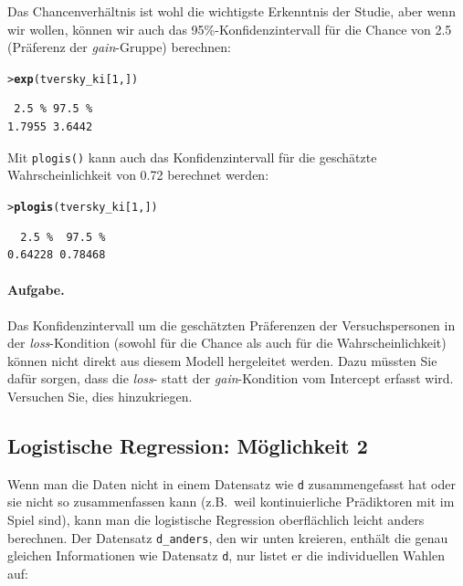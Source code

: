 \documentclass[oneside, 10pt]{book}\usepackage[]{graphicx}\usepackage[]{xcolor}
\makeatletter
\newcommand{\hlnum}[1]{\textcolor[rgb]{0.686,0.059,0.569}{#1}}%
\newcommand{\hlstd}[1]{\textcolor[rgb]{0.345,0.345,0.345}{#1}}%
\newcommand{\hlkwd}[1]{\textcolor[rgb]{0.737,0.353,0.396}{\textbf{#1}}}%
\newenvironment{kframe}{%
 \def\at@end@of@kframe{}%
 \ifinner\ifhmode%
  \def\at@end@of@kframe{\end{minipage}}%
  \begin{minipage}{\columnwidth}%
 \fi\fi%
 \def\FrameCommand##1{\hskip\@totalleftmargin \hskip-\fboxsep
 \colorbox{shadecolor}{##1}\hskip-\fboxsep
     \hskip-\linewidth \hskip-\@totalleftmargin \hskip\columnwidth}%
 \MakeFramed {\advance\hsize-\width
   \@totalleftmargin\z@ \linewidth\hsize
   \@setminipage}}%
 {\par\unskip\endMakeFramed%
 \at@end@of@kframe}
\newenvironment{knitrout}{}{} %
\makeatother
\begin{document}
Das Chancenverhältnis ist wohl die wichtigste Erkenntnis
der Studie, aber wenn wir wollen, können wir auch
das 95\%-Konfidenzintervall für die Chance
von 2.5 (Präferenz der \textit{gain}-Gruppe) berechnen:
\begin{knitrout}
\color{fgcolor}\begin{kframe}
\begin{alltt}
\hlstd{> }\hlkwd{exp}\hlstd{(tversky_ki[}\hlnum{1}\hlstd{, ])}
\end{alltt}
\begin{verbatim}
 2.5 % 97.5 % 
1.7955 3.6442 
\end{verbatim}
\end{kframe}
\end{knitrout}

Mit \texttt{plogis()} kann auch das Konfidenzintervall
für die geschätzte Wahrscheinlichkeit von 0.72 berechnet werden:
\begin{knitrout}
\color{fgcolor}\begin{kframe}
\begin{alltt}
\hlstd{> }\hlkwd{plogis}\hlstd{(tversky_ki[}\hlnum{1}\hlstd{, ])}
\end{alltt}
\begin{verbatim}
  2.5 %  97.5 % 
0.64228 0.78468 
\end{verbatim}
\end{kframe}
\end{knitrout}

\paragraph{Aufgabe.}
Das Konfidenzintervall um die geschätzten Präferenzen
der Versuchspersonen in der \textit{loss}-Kondition
(sowohl für die Chance als auch für die Wahrscheinlichkeit)
können nicht direkt aus diesem Modell hergeleitet werden.
Dazu müssten Sie dafür sorgen, dass die \textit{loss}-
statt der \textit{gain}-Kondition vom Intercept erfasst wird.
Versuchen Sie, dies hinzukriegen.

\subsection{Logistische Regression: Möglichkeit 2}
Wenn man die Daten nicht in einem Datensatz wie \texttt{d}
zusammengefasst hat oder sie nicht so zusammenfassen kann
(z.B.\ weil kontinuierliche Prädiktoren mit im Spiel sind),
kann man die logistische Regression oberflächlich leicht
anders berechnen. Der Datensatz \texttt{d\_anders},
den wir unten kreieren, enthält die genau gleichen Informationen
wie Datensatz \texttt{d}, nur listet er die individuellen
Wahlen auf:
\end{document}
